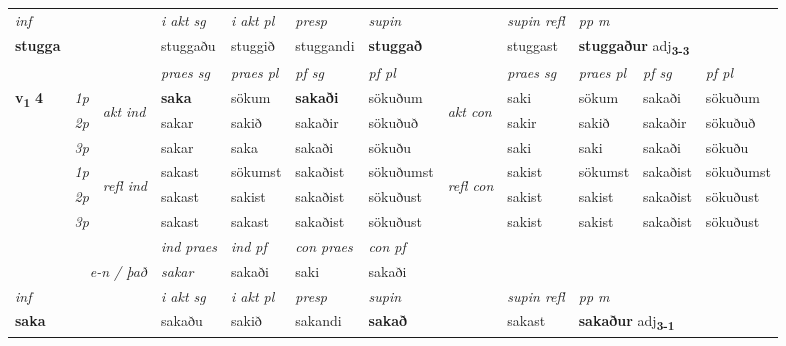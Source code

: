 \begin{longtable}[l]{X>{\footnotesize\itshape}llXXXXlXXXX}
\cmidrule{4-7}
   {\textit{inf}} & &  & \textit{i akt sg} & \textit{i akt pl}   & \textit{presp} & \textit{supin} && \textit{supin refl} & \textit{pp m} \\*
  {\textbf{stugga}} & && stuggaðu  & stuggið   & stuggandi &  \textbf{stuggað} && stuggast & \multicolumn{2}{l}{\textbf{stuggaður} adj\textbf{\textsubscript{3-3}}} \\*

\midrule

 & &   & \textit{praes sg}  & \textit{praes pl}    & \textit{ pf sg} & \textit{pf pl} & & \textit{praes sg}  & \textit{praes pl}    & \textit{pf sg} & \textit{pf pl }  \\ \cmidrule{4-7} \cmidrule{9-12}
 \multirow{2}{*}{{{\textbf{v{\textsubscript{1}}} \Large{\textbf{4}}}}}  & 1p & \multirow{3}{*}{\begin{turn}{90}\textit{akt ind}\end{turn}} & \textbf{saka} & sökum & \textbf{sakaði} & sökuðum & \multirow{3}{*}{\begin{turn}{90}\textit{akt con}\end{turn}} &saki & sökum & sakaði & sökuðum\\*
 & 2p &  &  sakar  & sakið & sakaðir & sökuðuð & & sakir & sakið & sakaðir & sökuðuð \\*
 & 3p &  & sakar & saka & sakaði & sökuðu & & saki & saki& sakaði & sökuðu \\*
\cmidrule{4-7} \cmidrule{9-12}
 & 1p & \multirow{3}{*}{\begin{turn}{90}\textit{refl ind}\end{turn}}  & sakast & sökumst & sakaðist & sökuðumst & \multirow{3}{*}{\begin{turn}{90}\textit{refl con}\end{turn}}  &sakist & sökumst & sakaðist & sökuðumst \\*
 & 2p &  & sakast & sakist & sakaðist & sökuðust & &sakist & sakist & sakaðist & sökuðust \\*
 & 3p  & & sakast & sakast & sakaðist & sökuðust & & sakist & sakist& sakaðist & sökuðust \\*
\cmidrule{4-7} \cmidrule{9-12}

   && &  \textit{ind praes} & \textit{ind pf} & \textit{con praes} & \textit{con pf} \\*
\multicolumn{3}{r}{\textit{e-n / það}} & sakar & sakaði & saki & sakaði \\*

\cmidrule{4-7}
   {\textit{inf}} & &  & \textit{i akt sg} & \textit{i akt pl}   & \textit{presp} & \textit{supin} && \textit{supin refl} & \textit{pp m} \\*
  {\textbf{saka}} & && sakaðu  & sakið   & sakandi &  \textbf{sakað} && sakast & \multicolumn{2}{l}{\textbf{sakaður} adj\textbf{\textsubscript{3-1}}} \\*


\end{longtable}
